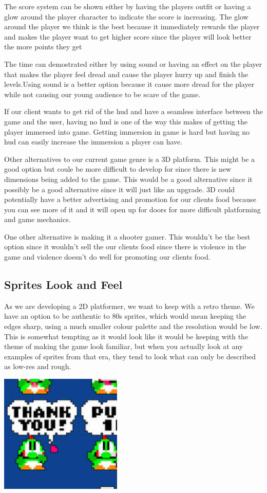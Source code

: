 \documentclass{article}
\begin{document}
The score system can be shown either by having the players outfit or having a glow around the player character to indicate the score is increasing. The glow around the player  we think is the best because it immediately rewards the player and makes the player want to get higher score since the player will look better the more points they get 

The time can demostrated either  by using sound or having an effect on the player that makes the player feel dread and cause the player hurry up and finish the levels.Using sound is a better option because it cause more dread for the player while not causing our young audience to be scare of the game. 

If our client wants to get rid of the hud and have a seamless interface between the game and the user, having no hud is one of the way this makes of getting the player immersed into game. Getting immersion in game is hard but having no hud can easily increase the immersion a player can have.

Other alternatives to our current game genre is a 3D platform. This might be a good option but coule be more difficult to develop for since there is new dimensions being added to the game. This would be a good alternative since it possibly be a good alternative since it will just like an upgrade. 3D could potentially have a better advertising and promotion for our clients food because you can see more of it and it will open up for doors for more difficult platforming and game mechanics.

One other alternative is making it a shooter gamer. This wouldn't be the best option since it wouldn't sell the our clients food since there is violence in the game and violence doesn't do well for promoting our clients food. 

\subsection{ Sprites Look and Feel }
As we are developing a 2D platformer, we want to keep with a retro theme. We have an option to be authentic to 80s sprites, which would mean keeping the edges sharp, using a much smaller colour palette and the resolution would be low.
This is somewhat tempting as it would look like it would be keeping with the theme of making the game look familiar, but when you actually look at any examples of sprites from that era, they tend to look what can only be described as low-res and rough.

\includegraphics[scale=0.5]{TraditionalSprite}
\end{document}
